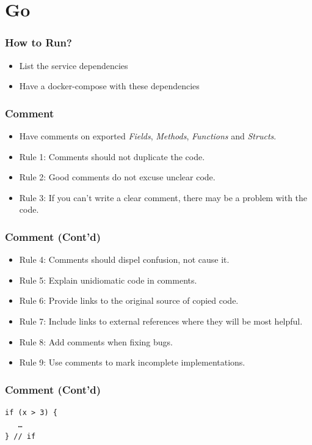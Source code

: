 \documentclass{efd-lecture}
\begin{document}
\section{Go}

\begin{frame}
  \frametitle{How to Run?}
  \begin{itemize}
    \item List the service dependencies
    \item Have a docker-compose with these dependencies
  \end{itemize}
\end{frame}

\begin{frame}
  \frametitle{Comment}
  \begin{itemize}
    \item Have comments on exported \textit{\color{YellowOrange}Fields}, \textit{\color{LimeGreen}Methods},
      \textit{\color{Cyan}Functions} and \textit{\color{RubineRed}Structs}.
    \item Rule 1: Comments should not duplicate the code.
    \item Rule 2: Good comments do not excuse unclear code.
    \item Rule 3: If you can’t write a clear comment, there may be a problem with the code.
  \end{itemize}
\end{frame}

\begin{frame}
  \frametitle{Comment (Cont'd)}
  \begin{itemize}
    \item Rule 4: Comments should dispel confusion, not cause it.
    \item Rule 5: Explain unidiomatic code in comments.
    \item Rule 6: Provide links to the original source of copied code.
    \item Rule 7: Include links to external references where they will be most helpful.
    \item Rule 8: Add comments when fixing bugs.
    \item Rule 9: Use comments to mark incomplete implementations.
  \end{itemize}
\end{frame}

\begin{frame}[fragile]
  \frametitle{Comment (Cont'd)}
  \begin{verbatim}
if (x > 3) {
   …
} // if
  \end{verbatim}
\end{frame}
\end{document}
